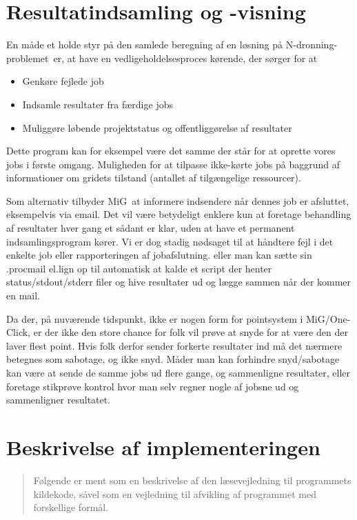 \documentclass[pdf,draft,a4paper,11pt]{article}
\newcommand{\mig}{MiG}
\newcommand{\oc}{One-Click}
\newcommand{\nq}{N-dronning-problemet}
\begin{document}
\section{Resultatindsamling og -visning}

En måde et holde styr på den samlede beregning af en løsning på \nq\ er, at have en vedligeholdelsesproces kørende, der sørger for at 
\begin{itemize}
	\item Genkøre fejlede job
	\item Indsamle resultater fra færdige jobs
	\item Muliggøre løbende projektstatus og offentliggørelse af resultater 
\end{itemize}
Dette program kan for eksempel være det samme der står for at oprette vores jobs i første omgang. Muligheden for at tilpasse ikke-kørte jobs på baggrund af informationer om gridets tilstand (antallet af tilgængelige ressourcer). 

Som alternativ tilbyder \mig\ at informere indsendere når dennes job er afsluttet, eksempelvis via email. Det vil være betydeligt enklere kun at foretage behandling af resultater hver gang et sådant er klar, uden at have et permanent indsamlingsprogram kører. Vi er dog stadig nødsaget til at håndtere fejl i det enkelte job eller rapporteringen af jobafslutning. 
eller man kan sætte sin .procmail el.lign op til automatisk at kalde et script der
henter status/stdout/stderr filer og hive resultater ud og lægge sammen når der
kommer en mail.

Da der, på nuværende tidspunkt, ikke er nogen form for pointsystem i \mig/\oc,
er der ikke den store chance for folk vil prøve at snyde for at være den der
laver flest point. Hvis folk derfor sender forkerte resultater ind må det
nærmere betegnes som sabotage, og ikke snyd. Måder man kan forhindre
snyd/sabotage kan være at sende de samme jobs ud flere gange, og sammenligne
resultater, eller foretage stikprøve kontrol hvor man selv regner nogle af
jobsne ud og sammenligner resultatet. 

\section{Beskrivelse af implementeringen}\label{implementering}
\begin{verse}
	Følgende er ment som en beskrivelse af den læsevejledning til programmets kildekode, såvel som en vejledning til afvikling af programmet med forskellige formål. 
\end{verse}
\end{document}
